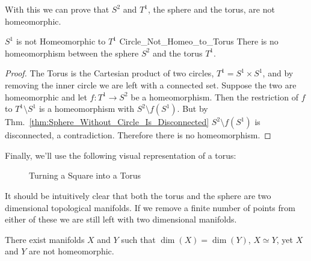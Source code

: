            With this we can prove that $S^{2}$ and $T^{1}$, the sphere and the
            torus, are not homeomorphic.
            \begin{ltheorem}{$S^{1}$ is not Homeomorphic to $T^{1}$}
                            {Circle_Not_Homeo_to_Torus}
                There is no homeomorphism between the sphere $S^{2}$ and
                the torus $T^{1}$.
            \end{ltheorem}
            \begin{proof}
                The Torus is the Cartesian product of two circles,
                $T^{1}=S^{1}\times{S}^{1}$, and by removing the inner circle we
                are left with a connected set. Suppose the two are homeomorphic
                and let $f:T^{1}\rightarrow{S}^{2}$ be a homeomorphism. Then the
                restriction of $f$ to $T^{1}\setminus{S}^{1}$ is a homeomorphism
                with $S^{2}\setminus{f}(S^{1})$. But by
                Thm.~\ref{thm:Sphere_Without_Circle_Is_Disconnected}
                $S^{2}\setminus{f}(S^{1})$ is disconnected, a contradiction.
                Therefore there is no homeomorphism.
            \end{proof}
            Finally, we'll use the following visual representation of a torus:
            \begin{figure}[H]
                \centering
                \captionsetup{type=figure}
                \caption{Turning a Square into a Torus}
                \label{fig:plane_representation_of_a_torus}
            \end{figure}
            It should be intuitively clear that both the torus and the sphere
            are two dimensional topological manifolds. If we remove a finite
            number of points from either of these we are still left with
            two dimensional manifolds.
            \begin{theorem}
                There exist manifolds $X$ and $Y$ such that
                $\dim(X)=\dim(Y)$, ${X}\simeq{Y}$,
                yet $X$ and $Y$ are not homeomorphic.
            \end{theorem}
